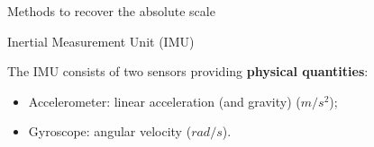 \documentclass{beamer}
\begin{document}
\begin{frame}{Methods to recover the absolute scale}
\begin{figure}
{\begin{subfigure}[b]{0.3\textwidth}
      \end{subfigure}
    }
  \end{figure}
\end{frame}

\begin{frame}{Inertial Measurement Unit (IMU)}

The IMU consists of two sensors providing \textbf{physical quantities}:
\begin{itemize}
\item Accelerometer: linear acceleration (and gravity) ($m/s^2$);
\item Gyroscope: angular velocity ($rad/s$).
\end{itemize}

\end{frame}
\end{document}
